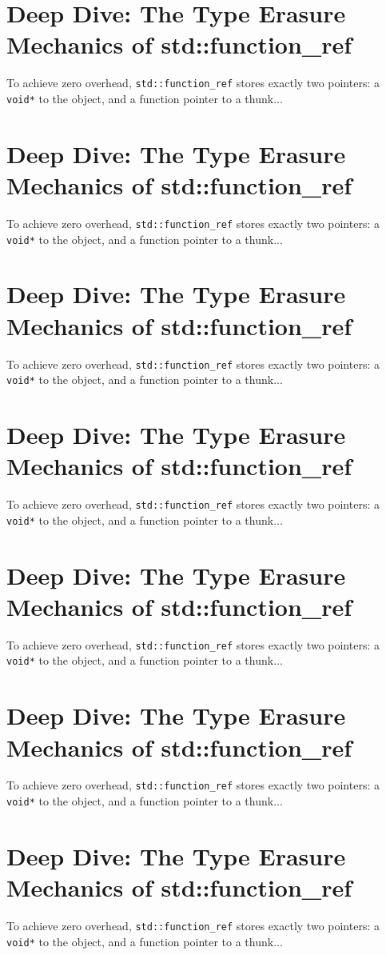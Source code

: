 \section{Deep Dive: The Type Erasure Mechanics of std::function_ref}
To achieve zero overhead, \texttt{std::function_ref} stores exactly two pointers: a \texttt{void*} to the object, and a function pointer to a thunk...

\section{Deep Dive: The Type Erasure Mechanics of std::function_ref}
To achieve zero overhead, \texttt{std::function_ref} stores exactly two pointers: a \texttt{void*} to the object, and a function pointer to a thunk...

\section{Deep Dive: The Type Erasure Mechanics of std::function_ref}
To achieve zero overhead, \texttt{std::function_ref} stores exactly two pointers: a \texttt{void*} to the object, and a function pointer to a thunk...

\section{Deep Dive: The Type Erasure Mechanics of std::function_ref}
To achieve zero overhead, \texttt{std::function_ref} stores exactly two pointers: a \texttt{void*} to the object, and a function pointer to a thunk...

\section{Deep Dive: The Type Erasure Mechanics of std::function_ref}
To achieve zero overhead, \texttt{std::function_ref} stores exactly two pointers: a \texttt{void*} to the object, and a function pointer to a thunk...

\section{Deep Dive: The Type Erasure Mechanics of std::function_ref}
To achieve zero overhead, \texttt{std::function_ref} stores exactly two pointers: a \texttt{void*} to the object, and a function pointer to a thunk...

\section{Deep Dive: The Type Erasure Mechanics of std::function_ref}
To achieve zero overhead, \texttt{std::function_ref} stores exactly two pointers: a \texttt{void*} to the object, and a function pointer to a thunk...

